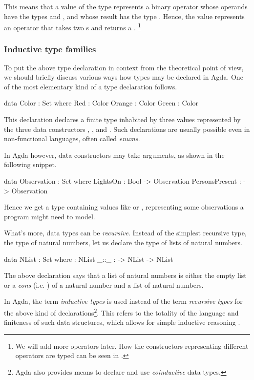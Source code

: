 \noindent This means that a value of the type  represents
a binary operator whose operands have the types  and ,
and whose result has the type . Hence, the value 
represents an operator that takes two s and returns a .%
\footnote{We will add more operators later. How the constructors representing
different operators are typed can be seen in .}

\subsubsection{Inductive type families}

To put the above type declaration in context from the theoretical point of view,
we should briefly discuss various ways how types may be declared in Agda.
One of the most elementary kind of a type declaration follows.
\begin{code}
  data Color : Set where
    Red : Color
    Orange : Color
    Green : Color
\end{code}
This declaration declares a finite type inhabited by three values represented by 
the three data constructors , , and . Such declarations
are usually possible even in non-functional languages, often called \emph{enums}.

In Agda however, data constructors may take arguments, as shown in the following snippet.
\begin{code}
  data Observation : Set where
    LightsOn : Bool -> Observation
    PersonsPresent : \bN -> Observation
\end{code}
Hence we get a type containing values like  or ,
representing some observations a program might need to model.

What's more, data types can be \emph{recursive}. Instead of the simplest recursive type,
the type of natural numbers, let us declare the type of lists of natural numbers.
\begin{code}
  data NList : Set where
    \NIL : NList
    _::_ : \bN -> NList -> NList
\end{code}
The above declaration says that a list of natural numbers is either the empty list \ident{[\,]}
or a \emph{cons} (i.e. \ident{\_::\_}) of a natural number and a list of natural numbers.

In Agda, the term \emph{inductive types} is used instead of the term \emph{recursive types}
for the above kind of declarations\footnote{Agda also provides means to declare and use
\emph{coinductive} data types.}. This refers to the totality of the language
and finiteness of such data structures, which allows for simple inductive reasoning
\cite[Sec.~3.1, Remark]{bove-dybjer}.

